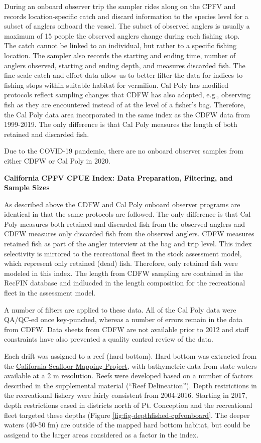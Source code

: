 \documentclass[
  english,
  a4paper,
]{article}
\begin{document}
During an onboard observer trip the sampler rides along on the CPFV and records
location-specific catch and discard information to the species level for a subset
of anglers onboard the vessel. The subset of observed anglers is usually a
maximum of 15 people the observed anglers change during each fishing stop.\\
The catch cannot be linked to an individual, but rather
to a specific fishing location. The sampler also records the starting and
ending time, number of anglers observed, starting and ending depth, and measures
discarded fish. The fine-scale catch and effort data allow us to better filter
the data for indices to fishing stops within suitable habitat for vermilion.
Cal Poly has modified protocols reflect sampling changes that CDFW
has also adopted, e.g., observing fish as they are encountered instead of at
the level of a fisher's bag. Therefore, the Cal Poly data area incorporated in
the same index as the CDFW data from 1999-2019. The only difference is that
Cal Poly measures the length of both retained and discarded fish.

Due to the COVID-19 pandemic, there are no onboard observer samples from either
CDFW or Cal Poly in 2020.

\textbf{California CPFV CPUE Index: Data Preparation, Filtering, and Sample Sizes}

As described above the CDFW and Cal Poly onboard observer programs are identical
in that the same protocols are followed. The only difference is that Cal Poly
measures both retained and discarded fish from the observed anglers and CDFW
measures only discarded fish from the observed anglers. CDFW measures retained
fish as part of the angler interview at the bag and trip level. This index
selectivity is mirrored to the recreational
fleet in the stock assessment model, which represent only retained (dead)
fish. Therefore, only retained fish were modeled in this index. The length
from CDFW sampling are contained in the RecFIN database and indlucded in the
length composition for the recreational fleet in the assessment model.

A number of filters are applied to these data. All of the Cal Poly data were
QA/QC-ed once key-punched, whereas a number of errors remain in the
data from CDFW. Data sheets from CDFW are not available prior to 2012 and
staff constraints have also prevented a quality control review of the data.

Each drift was assigned to a reef (hard bottom). Hard bottom was extracted from
the \href{http://seafloor.otterlabs.org/index.html}{California Seafloor Mapping Project},
with bathymetric data from state waters available at a 2 m resolution. Reefs were
developed based on a number of factors described in the supplemental material
(``Reef Delineation''). Depth restrictions in the recreational fishery were fairly
consistent from 2004-2016. Starting in 2017, depth restrictions eased in districts
north of Pt. Conception and the recreational fleet targeted these depths
(Figure \ref{fig:fig-depthfished-cpfvonboard}. The deeper waters (40-50 fm) are
outside of the mapped hard bottom habitat, but could be assigend to the larger
areas considered as a factor in the index.
\end{document}
